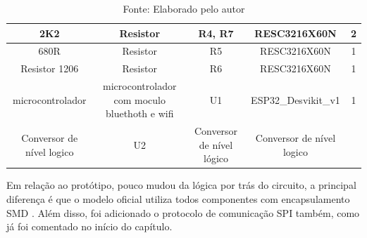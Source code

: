\documentclass[../poliXuniversity_hospital_-USP-report.tex]{subfiles}
\begin{document}
\begin{table}[!ht]
\begin{adjustbox}{width=\columnwidth,center}
\begin{tabular}{|c|c|c|c|c|}
2K2                       & Resistor                                     & R4, R7                    & RESC3216X60N              & 2        \\ \hline
680R                      & Resistor                                     & R5                        & RESC3216X60N              & 1        \\ \hline
Resistor 1206             & Resistor                                     & R6                        & RESC3216X60N              & 1        \\ \hline
microcontrolador          & microcontrolador com moculo bluethoth e wifi & U1                        & ESP32\_Desvikit\_v1       & 1        \\ \hline
Conversor de nível logico & U2                                           & Conversor de nível lógico & Conversor de nível logico &          \\ \hline

\end{tabular}
\end{adjustbox}
\centering
\caption*{Fonte: Elaborado pelo autor}
\label{table:Componentes Utilizados na placa de Sinalização}
\end{table}

Em relação ao protótipo, pouco mudou da lógica por trás do circuito, a principal diferença é que o modelo oficial utiliza todos componentes com encapsulamento SMD \cite{SMD_def}. Além disso, foi adicionado o protocolo de comunicação SPI também, como já foi comentado no início do capítulo.
\end{document}
